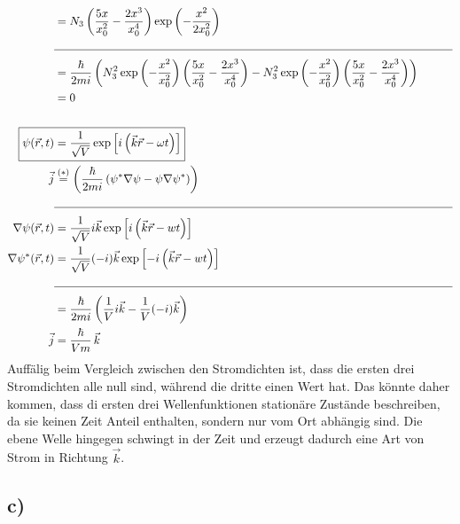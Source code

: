 \begin{align*}
        &= N_3 \left( \frac{5x}{x_0^2} - \frac{2x^3}{x_0^4} \right) \exp \left( -\frac{x^2}{2x_0^2} \right)\\
        &\text{\noindent\makebox[\linewidth]{\rule{\linewidth}{0.4pt}}}\\
        &= \frac{\hbar}{2mi} \left( N_3^2 \exp \left( -\frac{x^2}{x_0^2} \right) \left( \frac{5x}{x_0^2} - \frac{2x^3}{x_0^4} \right) - N_3^2 \exp \left( -\frac{x^2}{x_0^2} \right) \left( \frac{5x}{x_0^2} - \frac{2x^3}{x_0^4} \right) \right)\\
        &= 0\\
        \\
        \Aboxed{\psi(\vec{r}, t) &= \frac{1}{\sqrt{V}} \exp \left[ i \left( \vec{k} \vec{r} - \omega t \right) \right]}\\
        \vec{j} &\stackrel{(*)}{=} \left( \frac{\hbar}{2mi} \left( \psi^* \nabla \psi - \psi \nabla \psi^* \right) \right)\\
        &\text{\noindent\makebox[\linewidth]{\rule{\linewidth}{0.4pt}}}\\
        \nabla \psi(\vec{r}, t) &= \frac{1}{\sqrt{V}} i\vec{k} \exp \left[ i \left( \vec{k} \vec{r} - wt \right) \right]\\
        \nabla \psi^*(\vec{r}, t) &= \frac{1}{\sqrt{V}} (-i)\vec{k} \exp \left[ -i \left( \vec{k} \vec{r} - wt \right) \right]\\
        &\text{\noindent\makebox[\linewidth]{\rule{\linewidth}{0.4pt}}}\\
        &= \frac{\hbar}{2mi} \left( \frac{1}{V} i\vec{k} - \frac{1}{V} (-i)\vec{k} \right)\\
        \vec{j} &= \frac{\hbar}{Vm}\, \vec{k}
    \end{align*}
  Auffälig beim Vergleich zwischen den Stromdichten ist, dass die ersten drei Stromdichten alle null sind, 
    während die dritte einen Wert hat. Das könnte daher kommen, dass di ersten drei Wellenfunktionen 
    stationäre Zustände beschreiben, da sie keinen Zeit Anteil enthalten, sondern nur vom Ort abhängig sind.
    Die ebene Welle hingegen schwingt in der Zeit und erzeugt dadurch eine Art von Strom in Richtung $\vec{k}$.

\newpage
\subsection{c)}

